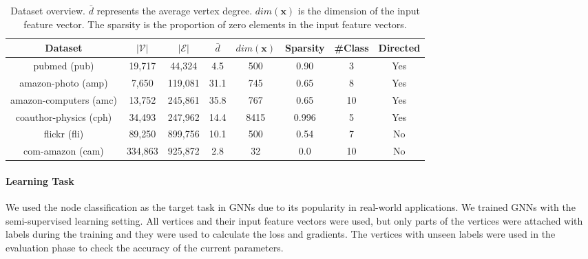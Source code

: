\begin{table}
    \centering
    \small
    \begin{tabular}{cccccccc}
        \toprule
        Dataset                                                 & $|\mathcal{V}|$ & $|\mathcal{E}|$ & $\bar{d}$ & $dim(\boldsymbol{x})$ & Sparsity & \#Class & Directed \\
        \midrule
        pubmed (pub) \cite{yang2016_revisiting_semisupervised}  & 19,717          & 44,324          & 4.5       & 500                   & 0.90     & 3       & Yes      \\
        amazon-photo (amp) \cite{shchur2018_pitfall_of_gnn}     & 7,650           & 119,081         & 31.1      & 745                   & 0.65     & 8       & Yes      \\
        amazon-computers (amc) \cite{shchur2018_pitfall_of_gnn} & 13,752          & 245,861         & 35.8      & 767                   & 0.65     & 10      & Yes      \\
        coauthor-physics (cph) \cite{shchur2018_pitfall_of_gnn} & 34,493          & 247,962         & 14.4      & 8415                  & 0.996    & 5       & Yes      \\
        flickr (fli) \cite{zeng2020_graphsaint}                 & 89,250          & 899,756         & 10.1      & 500                   & 0.54     & 7       & No       \\
        com-amazon (cam) \cite{yang2012_defining}               & 334,863         & 925,872         & 2.8       & 32                    & 0.0      & 10      & No       \\
        \bottomrule
    \end{tabular}
    \caption{Dataset overview. $\bar{d}$ represents the average vertex degree. $dim(\boldsymbol{x})$ is the dimension of the input feature vector. The sparsity is the proportion of zero elements in the input feature vectors.}
    \label{tab:dataset_overview}
\end{table}

\paragraph{Learning Task}
We used the node classification as the target task in GNNs due to its popularity in real-world applications.
We trained GNNs with the semi-supervised learning setting.
All vertices and their input feature vectors were used, but only parts of the vertices were attached with labels during the training and they were used to calculate the loss and gradients.
The vertices with unseen labels were used in the evaluation phase to check the accuracy of the current parameters.


